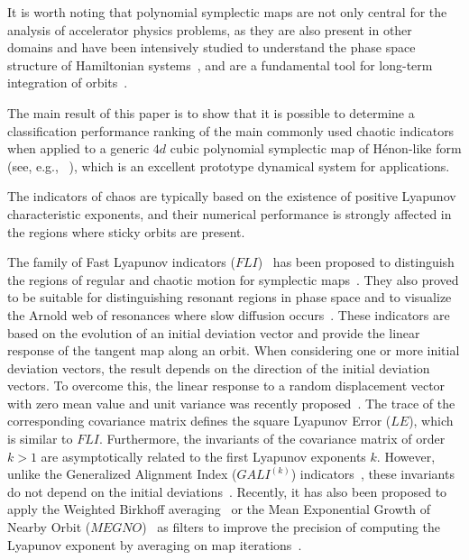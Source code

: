 It is worth noting that polynomial symplectic maps are not only central for the analysis of accelerator physics problems, as they are also present in other domains and have been intensively studied to understand the phase space structure of Hamiltonian systems~\cite{Turaev2003}, and are a fundamental tool for long-term integration of orbits~\cite{Bazzani:262179}. 

The main result of this paper is to show that it is possible to determine a classification performance ranking of the main commonly used chaotic indicators when applied to a generic $4d$ cubic polynomial symplectic map of H\'enon-like form (see, e.g., ~\cite{Bazzani:262179}), which is an excellent prototype dynamical system for applications.

The indicators of chaos are typically based on the existence of positive Lyapunov characteristic exponents, and their numerical performance is strongly affected in the regions where sticky orbits are present.

The family of Fast Lyapunov indicators ($FLI$)~\cite{Froeschle1997} has been proposed to distinguish the regions of regular and chaotic motion for symplectic maps~\cite{SZEZECH2005394}. They also proved to be suitable for distinguishing resonant regions in phase space and to visualize the Arnold web of resonances where slow diffusion occurs~\cite{Arnold:937549}. These indicators are based on the evolution of an initial deviation vector and provide the linear response of the tangent map along an orbit. When considering one or more initial deviation vectors, the result depends on the direction of the initial deviation vectors. To overcome this, the linear response to a random displacement vector with zero mean value and unit variance was recently proposed~\cite{Turchetti2017}. The trace of the corresponding covariance matrix defines the square Lyapunov Error ($LE$), which is similar to $FLI$. Furthermore, the invariants of the covariance matrix of order $k>1$ are asymptotically related to the first Lyapunov exponents $k$. However, unlike the Generalized Alignment Index ($GALI^{(k)}$) indicators~\cite{Bountis2007,Skokos2015}, these invariants do not depend on the initial deviations~\cite{Skokos2008}. Recently, it has also been proposed to apply the Weighted Birkhoff averaging~\cite{Das_2017} or the Mean Exponential Growth of Nearby Orbit ($MEGNO$)~\cite{Cincotta1996} as filters to improve the precision of computing the Lyapunov exponent by averaging on map iterations~\cite{Gozdziewski01,Mestre2011}.

